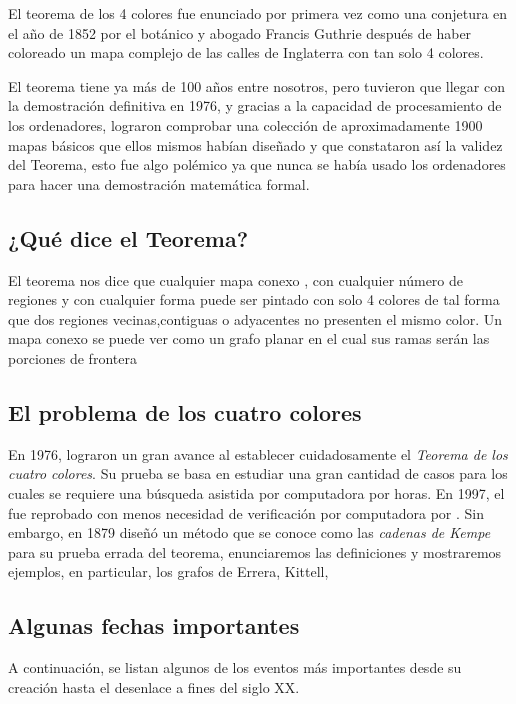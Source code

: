 \documentclass[
	3p,
	times,
	a4paper,
	authoryear
]{elsarticle}%
\begin{document}
El teorema de los 4 colores fue enunciado por primera vez como una conjetura en el año de 1852 por el botánico y abogado Francis Guthrie después de haber coloreado un mapa complejo de las calles de Inglaterra con tan solo 4 colores.

\noindent El teorema tiene ya más de 100 años entre nosotros, pero tuvieron que llegar \citeauthor{appel} con la demostración definitiva en 1976, y gracias a la capacidad de procesamiento de los ordenadores, lograron comprobar una colección de aproximadamente 1900 mapas básicos que ellos mismos habían diseñado y que constataron así la validez del Teorema, esto fue algo polémico ya que nunca se había usado los ordenadores para hacer una demostración matemática formal.

\subsection{¿Qué dice el Teorema?}\label{sec:1.3}
El teorema nos dice que cualquier mapa conexo , con cualquier número de regiones y con cualquier forma puede ser pintado con solo 4 colores de tal forma que dos regiones vecinas,contiguas o adyacentes no presenten el mismo color. Un mapa conexo se puede ver como un grafo planar en el cual sus ramas serán las porciones de frontera

\subsection{El problema de los cuatro colores}\label{sec:1.4}

En 1976, \citeauthor{appel} lograron un gran avance al establecer cuidadosamente el \emph{Teorema de los cuatro colores}. Su prueba se basa en estudiar una gran cantidad de casos para los cuales se requiere una búsqueda asistida por computadora por horas. En 1997, el fue reprobado con menos necesidad de verificación por computadora por \citeauthor{Robin}. Sin embargo, \citeauthor{kempe} en 1879 diseñó un método que se conoce como las \emph{cadenas de Kempe} para su prueba errada del teorema, enunciaremos las definiciones y mostraremos ejemplos, en particular, los grafos de Errera, Kittell, 

\subsection{Algunas fechas importantes}\label{sec:1.5}

A continuación, se listan algunos de los eventos más importantes desde su creación hasta el desenlace a fines del siglo XX.
\end{document}
